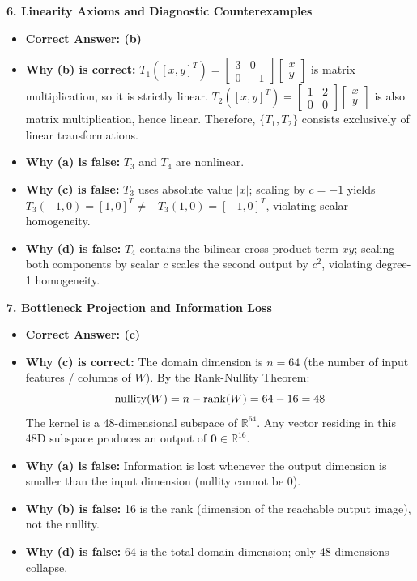 \textbf{6. Linearity Axioms and Diagnostic Counterexamples}
\begin{itemize}
    \item \textbf{Correct Answer: (b)}
    \item \textbf{Why (b) is correct:}
    $T_1\left([x, y]^T\right) = \begin{bmatrix} 3 & 0 \\ 0 & -1 \end{bmatrix} \begin{bmatrix} x \\ y \end{bmatrix}$ is matrix multiplication, so it is strictly linear.
    $T_2\left([x, y]^T\right) = \begin{bmatrix} 1 & 2 \\ 0 & 0 \end{bmatrix} \begin{bmatrix} x \\ y \end{bmatrix}$ is also matrix multiplication, hence linear.
    Therefore, $\{T_1, T_2\}$ consists exclusively of linear transformations.
    \item \textbf{Why (a) is false:} $T_3$ and $T_4$ are nonlinear.
    \item \textbf{Why (c) is false:} $T_3$ uses absolute value $|x|$; scaling by $c = -1$ yields $T_3(-1, 0) = [1, 0]^T \neq -T_3(1, 0) = [-1, 0]^T$, violating scalar homogeneity.
    \item \textbf{Why (d) is false:} $T_4$ contains the bilinear cross-product term $x y$; scaling both components by scalar $c$ scales the second output by $c^2$, violating degree-1 homogeneity.
\end{itemize}

\textbf{7. Bottleneck Projection and Information Loss}
\begin{itemize}
    \item \textbf{Correct Answer: (c)}
    \item \textbf{Why (c) is correct:} The domain dimension is $n = 64$ (the number of input features / columns of $W$). By the Rank-Nullity Theorem:
    \begin{equation*}
    \operatorname{nullity}(W) = n - \operatorname{rank}(W) = 64 - 16 = 48
    \end{equation*}
    The kernel is a 48-dimensional subspace of $\mathbb{R}^{64}$. Any vector residing in this 48D subspace produces an output of $\mathbf{0} \in \mathbb{R}^{16}$.
    \item \textbf{Why (a) is false:} Information is lost whenever the output dimension is smaller than the input dimension (nullity cannot be 0).
    \item \textbf{Why (b) is false:} 16 is the rank (dimension of the reachable output image), not the nullity.
    \item \textbf{Why (d) is false:} 64 is the total domain dimension; only 48 dimensions collapse.
\end{itemize}

